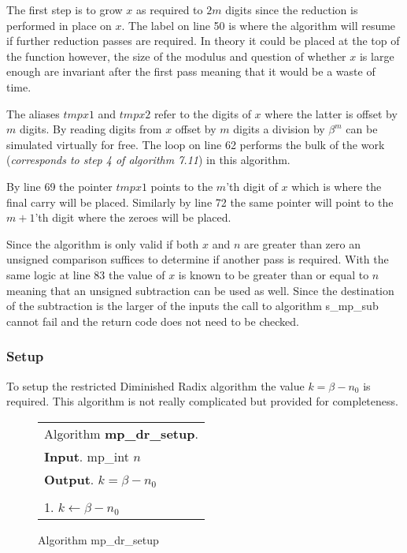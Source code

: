 \documentclass[b5paper]{book}
\begin{document}
The first step is to grow $x$ as required to $2m$ digits since the reduction is performed in place on $x$.  The label on line 50 is where
the algorithm will resume if further reduction passes are required.  In theory it could be placed at the top of the function however, the size of
the modulus and question of whether $x$ is large enough are invariant after the first pass meaning that it would be a waste of time.  

The aliases $tmpx1$ and $tmpx2$ refer to the digits of $x$ where the latter is offset by $m$ digits.  By reading digits from $x$ offset by $m$ digits
a division by $\beta^m$ can be simulated virtually for free.  The loop on line 62 performs the bulk of the work (\textit{corresponds to step 4 of algorithm 7.11})
in this algorithm.

By line 69 the pointer $tmpx1$ points to the $m$'th digit of $x$ which is where the final carry will be placed.  Similarly by line 72 the 
same pointer will point to the $m+1$'th digit where the zeroes will be placed.  

Since the algorithm is only valid if both $x$ and $n$ are greater than zero an unsigned comparison suffices to determine if another pass is required.  
With the same logic at line 83 the value of $x$ is known to be greater than or equal to $n$ meaning that an unsigned subtraction can be used
as well.  Since the destination of the subtraction is the larger of the inputs the call to algorithm s\_mp\_sub cannot fail and the return code
does not need to be checked.

\subsubsection{Setup}
To setup the restricted Diminished Radix algorithm the value $k = \beta - n_0$ is required.  This algorithm is not really complicated but provided for
completeness.

\begin{figure}[!here]
\begin{small}
\begin{center}
\begin{tabular}{l}
\hline Algorithm \textbf{mp\_dr\_setup}. \\
\textbf{Input}.   mp\_int $n$ \\
\textbf{Output}.  $k = \beta - n_0$ \\
\hline \\
1.  $k \leftarrow \beta - n_0$ \\
\hline
\end{tabular}
\end{center}
\end{small}
\caption{Algorithm mp\_dr\_setup}
\end{figure}
\end{document}
